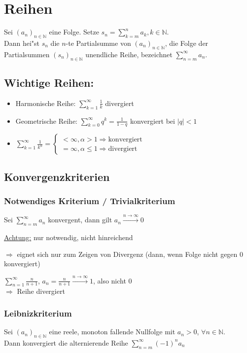 \documentclass[a4paper,12pt]{article}
\begin{document}
	\section{Reihen}
	\begin{defi}
		Sei $\left(a_n\right)_{n \in \mathbb{N}}$ eine Folge. Setze $s_n = \sum_{k = m}^{n} a_k, k \in \mathbb{N}$.\\
		Dann hei"st $s_n$ die $n$-te Partialsumme von $\left(a_n\right)_{n \in \mathbb{N}}$, die Folge der Partialsummen $\left(s_n\right)_{n \in \mathbb{N}}$ unendliche Reihe, bezeichnet $\sum_{n = m}^{\infty} a_n$.
	\end{defi}
	
	\subsection{Wichtige Reihen:}
	\begin{itemize}
		\item Harmonische Reihe: $\sum_{k = 1}^{\infty} \frac{1}{k}$ divergiert
		\item Geometrische Reihe: $\sum_{k = 0}^{\infty} q^k = \frac{1}{1-q}$ konvergiert bei $\left|q\right| < 1$
		\item $\sum_{k = 1}^{\infty} \frac{1}{k^\alpha} = \begin{cases}
			< \infty, \alpha > 1 \Rightarrow \text{konvergiert} \\ 
			= \infty, \alpha \leq 1 \Rightarrow \text{divergiert}
		\end{cases}$
	\end{itemize}
	\newpage

	\subsection{Konvergenzkriterien}
	\subsubsection{Notwendiges Kriterium / Trivialkriterium}
	\begin{defi}
		Sei $\sum_{n=m}^{\infty} a_n$ konvergent, dann gilt $a_n \xrightarrow{n \rightarrow \infty} 0$
	\end{defi}
	\underline{Achtung:} nur notwendig, nicht hinreichend
	\begin{center}
		$\Rightarrow$ eignet sich nur zum Zeigen von Divergenz (dann, wenn Folge nicht gegen 0 konvergiert)
	\end{center}
	\begin{bsp}
		\begin{center}
			$\sum_{n = 1}^{\infty} \frac{n}{n+1}$, $a_n = \frac{n}{n+1} \xrightarrow{n \rightarrow \infty} 1$, also nicht 0 \\
			$\Rightarrow$ Reihe divergiert
		\end{center}
	\end{bsp}

	\subsubsection{Leibnizkriterium}
	\begin{defi}
		Sei $\left(a_n\right)_{n \in \mathbb{N}}$ eine reele, monoton fallende Nullfolge mit $a_n > 0$, $\forall n \in \mathbb{N}$.\\
		Dann konvergiert die alternierende Reihe $\sum_{n = m}^{\infty} \left(-1\right)^n a_n$
	\end{defi}
\end{document}

